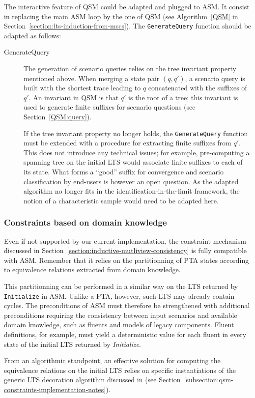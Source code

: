 The interactive feature of QSM could be adapted and plugged to ASM. It consist in replacing the main ASM loop by the one of QSM (see Algorithm~\ref{QSM} in Section~\ref{section:lts-induction-from-mscs}). The \texttt{GenerateQuery} function should be adapted as follows:
\begin{description}

\item[GenerateQuery] The generation of scenario queries relies on the tree invariant property mentioned above. When merging a state pair $(q,q')$, a scenario query is built with the shortest trace leading to $q$ concatenated with the suffixes of $q'$. An invariant in QSM is that $q'$ is the root of a tree; this invariant is used to generate finite suffixes for scenario questions (see Section~\ref{QSM:query}).

If the tree invariant property no longer holds, the \texttt{GenerateQuery} function must be extended with a procedure for extracting finite suffixes from $q'$. This does not introduce any technical issues; for example, pre-computing a spanning tree on the initial LTS would associate finite suffixes to each of its state. What forms a ``good'' suffix for convergence and scenario classification by end-users is however an open question. As the adapted algorithm no longer fits in the identification-in-the-limit framework, the notion of a characteristic sample would need to be adapted here.

\end{description}

\subsubsection*{Constraints based on domain knowledge}

Even if not supported by our current implementation, the constraint mechanism discussed in Section~\ref{section:inductive-mutliview-consistency} is fully compatible with ASM. Remember that it relies on the partitionning of PTA states according to equivalence relations extracted from domain knowledge. 

This partitionning can be performed in a similar way on the LTS returned by \texttt{Initialize} in ASM. Unlike a PTA, however, such LTS may already contain cycles. The preconditions of ASM must therefore be strengthened with additional preconditions requiring the consistency between input scenarios and available domain knowledge, such as fluents and models of legacy components. Fluent definitions, for example, must yield a deterministic value for each fluent in every state of the initial LTS returned by \emph{Initialize}.

From an algorithmic standpoint, an effective solution for computing the equivalence relations on the initial LTS relies on specific instantiations of the generic LTS decoration algorithm discussed in \cite{Damas:2011} (see Section~\ref{subsection:qsm-constraints-implementation-notes}).
